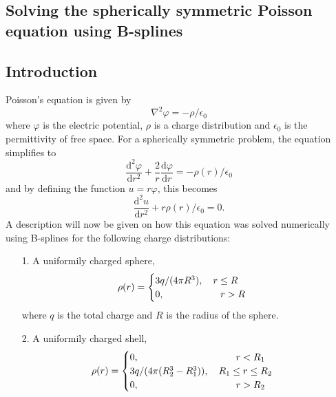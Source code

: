 \documentclass[twocolumn]{article}
\begin{document}
\begin{large}
\section*{Solving the spherically symmetric Poisson equation using B-splines}
\subsection*{Introduction}
Poisson's equation is given by
\begin{equation}
    \nabla^2\varphi = -\rho/\epsilon_0
\end{equation}
where $\varphi$ is the electric potential, $\rho$ is a charge distribution and $\epsilon_0$ is the permittivity of free space. For a spherically symmetric problem, the equation simplifies to
\begin{equation}
    \frac{\text{d}^2\varphi}{\text{d}r^2}+\frac{2}{r}\frac{\text{d}\varphi}{\text{d}r} = -\rho(r)/\epsilon_0
\end{equation}
and by defining the function $u=r\varphi$, this becomes
\begin{equation}
    \label{12apr1845}
    \frac{\text{d}^2u}{\text{d}r^2} + r\rho(r)/\epsilon_0 = 0.
\end{equation}
A description will now be given on how this equation was solved numerically using B-splines for the following charge distributions:
\begin{itemize}
    \item[1.] A uniformily charged sphere, 
    \begin{equation}
        \rho(r) = 
        \begin{cases}
            3q/(4\pi R^3),\quad r\leq R \\ 
            0,\hspace{1.7cm}\quad r>R
        \end{cases}
    \end{equation}
    where $q$ is the total charge and $R$ is the radius of the sphere.
    \item[2.] A uniformily charged shell,
    \begin{equation}
        \rho(r) = 
        \begin{cases}
            0,\hspace{3.2cm}\quad r<R_1  \\ 
            3q/(4\pi (R_2^3-R_1^3)),\quad R_1\leq r\leq R_2 \\ 
            0,\hspace{3.2cm}\quad r>R_2

\end{cases}
\end{equation}
\end{itemize}
\end{large}
\end{document}

